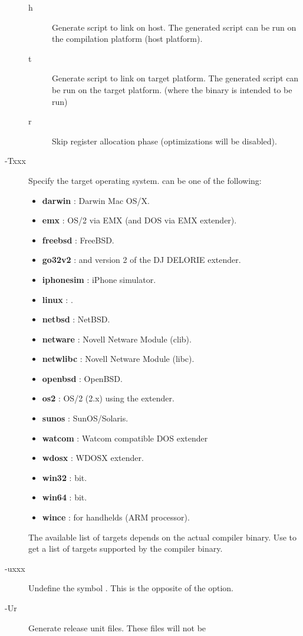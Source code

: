\begin{description}
\begin{description}
\item[h] Generate script to link on host. The generated script can be run on
the compilation platform (host platform).
\item[t] Generate script to link on target platform. The generated script
can be run on the target platform. (where the binary is intended to be run)
\item[r] Skip register allocation phase (optimizations will be disabled).
\end{description}
\item[-Txxx]  Specify the target operating system.  can be one of
the following:
\begin{itemize}
\item \textbf{darwin} : Darwin Mac OS/X.
\item \textbf{emx} : OS/2 via EMX (and DOS via EMX extender).
\item \textbf{freebsd} : FreeBSD.
\item \textbf{go32v2} : \dos and version 2 of the DJ DELORIE extender.
\item \textbf{iphonesim} : iPhone simulator.
\item \textbf{linux} : \linux.
\item \textbf{netbsd} : NetBSD.
\item \textbf{netware} : Novell Netware Module (clib).
\item \textbf{netwlibc} : Novell Netware Module (libc).
\item \textbf{openbsd} : OpenBSD.
\item \textbf{os2} : OS/2 (2.x) using the  extender.
\item \textbf{sunos} : SunOS/Solaris.
\item \textbf{watcom} : Watcom compatible DOS extender
\item \textbf{wdosx} : WDOSX extender.
\item \textbf{win32} :  bit.
\item \textbf{win64} :  bit.
\item \textbf{wince} : \windows for handhelds (ARM processor).
\end{itemize}
The available list of targets depends on the actual compiler binary.
Use  to get a list of targets supported by the compiler binary.
\item [-uxxx]  Undefine the symbol . This is the opposite
of the  option.
\item [-Ur]  Generate release unit files. These files will not be

\end{description}

